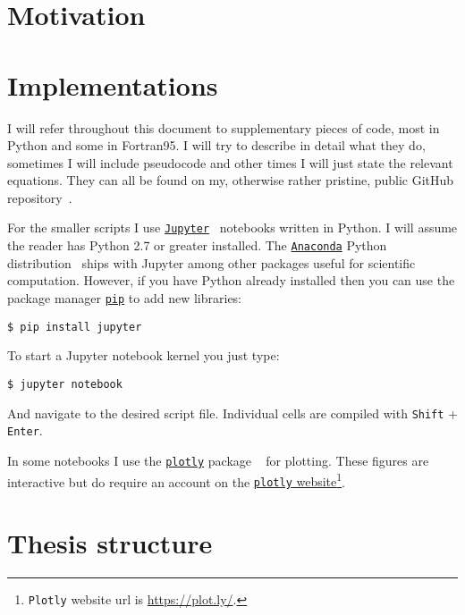 \section{Motivation}
\section{Implementations}
I will refer throughout this document to supplementary pieces of code, most in Python and some in Fortran95. I will try to describe in detail what they do, sometimes I will include pseudocode and other times I will just state the relevant equations. They can all be found on my, otherwise rather pristine, public GitHub repository~\cite{myGitHub}. 

For the smaller scripts I use \href{http://jupyter.org}{\texttt{Jupyter}}~\cite{Jupyter} notebooks written in Python. I will assume the reader has Python 2.7 or greater installed. The \href{https://anaconda.org/}{\texttt{Anaconda}} Python distribution~\cite{Conda} ships with Jupyter among other packages useful for scientific computation. However, if you have Python already installed then you can use the package manager \href{https://pypi.org/project/pip/}{\texttt{pip}} to add new libraries:
\begin{verbatim}
$ pip install jupyter
\end{verbatim}
To start a Jupyter notebook kernel you just type:
\begin{verbatim}
$ jupyter notebook
\end{verbatim}
And navigate to the desired script file. Individual cells are compiled with \texttt{Shift} + \texttt{Enter}.

In some notebooks I use the \href{https://plot.ly/}{\texttt{plotly}} package ~\cite{Plotly} for plotting. These figures are interactive but do require an account on the \href{https://plot.ly/}{\texttt{plotly} website}\footnote{ \texttt{Plotly} website url is \href{https://plot.ly/}{https://plot.ly/}.}.  

\section{Thesis structure}

